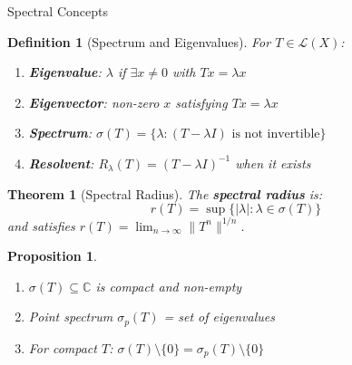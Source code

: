 \documentclass[aspectratio=169,10pt]{beamer}
\newtheorem{defn}{Definition}
\newtheorem{thm}{Theorem}
\newtheorem{prop}{Proposition}
\begin{document}
\begin{frame}{Spectral Concepts}
  \begin{defn}[Spectrum and Eigenvalues]
    For $T \in \mathcal{L}(X)$:
    \begin{enumerate}
      \item \textbf{Eigenvalue}: $\lambda$ if $\exists x \neq 0$ with $Tx = \lambda x$
      \item \textbf{Eigenvector}: non-zero $x$ satisfying $Tx = \lambda x$
      \item \textbf{Spectrum}: $\sigma(T) = \{\lambda : (T - \lambda I) \text{ is not invertible}\}$
      \item \textbf{Resolvent}: $R_\lambda(T) = (T - \lambda I)^{-1}$ when it exists
    \end{enumerate}
  \end{defn}

  \vspace{0.3cm}
  \begin{thm}[Spectral Radius]
    The \textbf{spectral radius} is:
    \[
    r(T) = \sup\{|\lambda| : \lambda \in \sigma(T)\}
    \]
    and satisfies $r(T) = \lim_{n \to \infty} \|T^n\|^{1/n}$.
  \end{thm}

  \vspace{0.3cm}
  \begin{prop}
    \begin{enumerate}
      \item $\sigma(T) \subseteq \mathbb{C}$ is compact and non-empty
      \item Point spectrum $\sigma_p(T)$ = set of eigenvalues
      \item For compact $T$: $\sigma(T) \setminus \{0\} = \sigma_p(T) \setminus \{0\}$
    \end{enumerate}
  \end{prop}
\end{frame}
\end{document}
